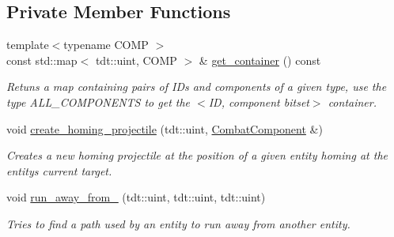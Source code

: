 \subsection*{Private Member Functions}
\begin{DoxyCompactItemize}
\item 
{\footnotesize template$<$typename C\+O\+MP $>$ }\\const std\+::map$<$ tdt\+::uint, C\+O\+MP $>$ \& \hyperlink{class_combat_system_a009e7e33b36a38e037662cc662b57774}{get\+\_\+container} () const 
\begin{DoxyCompactList}\small\item\em Retuns a map containing pairs of I\+Ds and components of a given type, use the type A\+L\+L\+\_\+\+C\+O\+M\+P\+O\+N\+E\+N\+TS to get the $<$ID, component bitset$>$ container. \end{DoxyCompactList}\item 
void \hyperlink{class_combat_system_a57555ff5cfbf11cabf4dc558c64e265a}{create\+\_\+homing\+\_\+projectile} (tdt\+::uint, \hyperlink{struct_combat_component}{Combat\+Component} \&)
\begin{DoxyCompactList}\small\item\em Creates a new homing projectile at the position of a given entity homing at the entity\textquotesingle{}s current target. \end{DoxyCompactList}\item 
void \hyperlink{class_combat_system_a77244dfa4506f9f88f43cb4a3f938098}{run\+\_\+away\+\_\+from\+\_\+} (tdt\+::uint, tdt\+::uint, tdt\+::uint)
\begin{DoxyCompactList}\small\item\em Tries to find a path used by an entity to run away from another entity. \end{DoxyCompactList}\end{DoxyCompactItemize}
